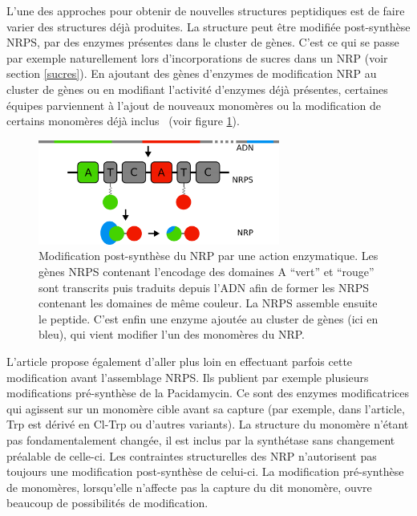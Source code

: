 L'une des approches pour obtenir de nouvelles structures peptidiques est de faire varier des structures déjà produites.
La structure peut être modifiée post-synthèse NRPS, par des enzymes présentes dans le cluster de gènes.
C'est ce qui se passe par exemple naturellement lors d'incorporations de sucres dans un NRP (voir section \ref{sucres}).
En ajoutant des gènes d'enzymes de modification NRP au cluster de gènes ou en modifiant l'activité d'enzymes déjà présentes, certaines équipes parviennent à l'ajout de nouveaux monomères ou la modification de certains monomères déjà inclus~\cite{giessen_ribosome-independent_2012} (voir figure \ref{post_synth}).

\begin{figure}[h!]
  \begin{center}
    \includegraphics[width=300px]{Figures/synthese/post_synth.png}
    \caption{\label{post_synth}Modification post-synthèse du NRP par une action enzymatique.
    Les gènes NRPS contenant l'encodage des domaines A ``vert'' et ``rouge'' sont transcrits puis traduits depuis l'ADN afin de former les NRPS contenant les domaines de même couleur.
    La NRPS assemble ensuite le peptide.
    C'est enfin une enzyme ajoutée au cluster de gènes (ici en bleu), qui vient modifier l'un des monomères du NRP.}
  \end{center}
\end{figure}

L'article \cite{winn_recent_2016} propose également d'aller plus loin en effectuant parfois cette modification avant l'assemblage NRPS.
Ils publient par exemple plusieurs modifications pré-synthèse de la Pacidamycin.
Ce sont des enzymes modificatrices qui agissent sur un monomère cible avant sa capture (par exemple, dans l'article, Trp est dérivé en Cl-Trp ou d'autres variants).
La structure du monomère n'étant pas fondamentalement changée, il est inclus par la synthétase sans changement préalable de celle-ci.
Les contraintes structurelles des NRP n'autorisent pas toujours une modification post-synthèse de celui-ci.
La modification pré-synthèse de monomères, lorsqu'elle n'affecte pas la capture du dit monomère, ouvre beaucoup de possibilités de modification.



